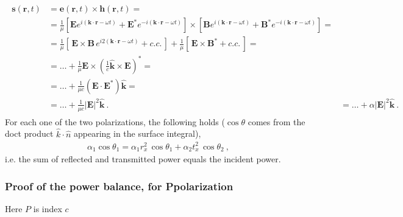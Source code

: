 \documentclass[letterpaper,10pt,italian]{jupyterBook}
\begin{document}
\begin{equation*}
\begin{split}\begin{aligned}
  \mathbf{s}(\mathbf{r},t) 
  & = \mathbf{e}(\mathbf{r},t) \times \mathbf{h}(\mathbf{r},t) = \\
  & = \frac{1}{\mu} \left[ \mathbf{E} e^{i(\mathbf{k} \cdot \mathbf{r} - \omega t)} + \mathbf{E}^* e^{-i(\mathbf{k} \cdot \mathbf{r} - \omega t)} \right] \times \left[ \mathbf{B} e^{i(\mathbf{k} \cdot \mathbf{r} - \omega t)} + \mathbf{B}^* e^{-i(\mathbf{k} \cdot \mathbf{r} - \omega t)}  \right] = \\
  & = \frac{1}{\mu} \left[ \, \mathbf{E} \times \mathbf{B} \, e^{i 2(\mathbf{k} \cdot \mathbf{r} - \omega t)} + c.c. \, \right] + \frac{1}{\mu} \left[ \, \mathbf{E} \times \mathbf{B}^* + c.c. \, \right] = \\
  & = \dots + \frac{1}{\mu} \mathbf{E} \times \left( \frac{1}{c} \hat{\mathbf{k}} \times \mathbf{E} \right)^* = \\
  & = \dots + \frac{1}{\mu c} \left( \mathbf{E} \cdot \mathbf{E}^* \right) \hat{\mathbf{k}} = \\
  & = \dots + \frac{1}{\mu c} | \mathbf{E} |^2 \hat{\mathbf{k}} \ .
  & = \dots + \alpha | \mathbf{E} |^2 \hat{\mathbf{k}} \ .
\end{aligned}\end{split}
\end{equation*}
\sphinxAtStartPar
For each one of the two polarizations, the following holds (\(\cos \theta\) comes from the doct product \(\hat{k} \cdot \hat{n}\) appearing in the surface integral),
\begin{equation*}
\begin{split}\alpha_1 \cos \theta_1 = \alpha_1 r_x^2 \, \cos \theta_1 + \alpha_2 t_x^2 \, \cos \theta_2 \ ,\end{split}
\end{equation*}
\sphinxAtStartPar
i.e. the sum of reflected and transmitted power equals the incident power.
\subsubsection*{Proof of the power balance, for P\sphinxhyphen{}polarization}

\sphinxAtStartPar
{} Here \(P\) is index \(c\)
\end{document}
